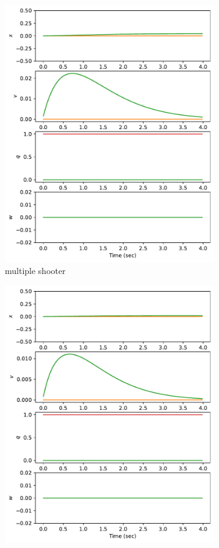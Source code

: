 \documentclass[]{article}
\begin{document}
\begin{figure}[H]
\begin{subfigure}[b]{0.3\textwidth}
		\includegraphics[width=\textwidth]{figures/statehover3.pdf}
		\caption{multiple shooter}
	\end{subfigure}
	\begin{subfigure}[b]{0.3\textwidth}
		\centering
		\includegraphics[width=\textwidth]{figures/statehover2.pdf}

\end{subfigure}
\end{figure}
\end{document}
